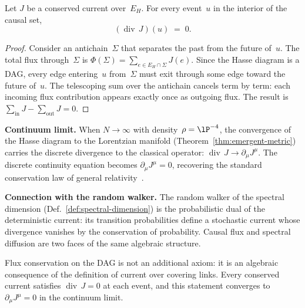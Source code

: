 \begin{theorem}
\label{thm:discrete-continuity}
Let $J$ be a conserved current over~$E_H$.  For every event~$u$
in the interior of the causal set,
\[
  (\operatorname{div}\,J)(u) \;=\; 0.
\]
\end{theorem}

\begin{proof}
Consider an antichain~$\Sigma$ that separates the past from the
future of~$u$.  The total flux through~$\Sigma$ is
$\Phi(\Sigma) = \sum_{e \in E_H \cap \Sigma} J(e)$.
Since the Hasse diagram is a DAG, every edge entering~$u$
from~$\Sigma$ must exit through some edge toward the future of~$u$.
The telescoping sum over the antichain cancels term by
term: each incoming flux contribution appears exactly
once as outgoing flux. The result is
$\sum_{\text{in}} J - \sum_{\text{out}} J = 0$.
\end{proof}

\medskip\noindent\textbf{Continuum limit.}\quad
When $N \to \infty$ with density~$\rho = \lP^{-4}$, the convergence
of the Hasse diagram to the Lorentzian manifold
(Theorem~\ref{thm:emergent-metric}) carries the discrete divergence to the
classical operator: $\operatorname{div}\,J \to \partial_\mu J^\mu$.
The discrete continuity equation becomes
$\partial_\mu J^\mu = 0$, recovering the standard conservation law
of general relativity~\cite{aslanbeigi2014}.

\medskip\noindent\textbf{Connection with the random walker.}\quad
The random walker of the spectral dimension
(Def.~\ref{def:spectral-dimension}) is the probabilistic dual of the
deterministic current: its transition probabilities define a
stochastic current whose divergence vanishes by the conservation
of probability. Causal flux and spectral diffusion are two faces of
the same algebraic structure.

\begin{result}[title={Flux Conservation}]
Flux conservation on the DAG is not an additional axiom: it is an
algebraic consequence of the definition of current over covering
links. Every conserved current satisfies
$\operatorname{div}\,J = 0$ at each event, and this statement converges to
$\partial_\mu J^\mu = 0$ in the continuum limit.
\end{result}


